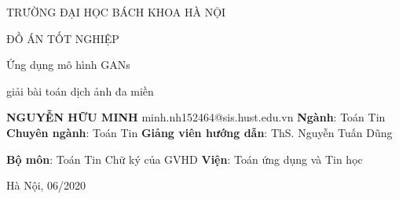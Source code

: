 {\begin{titlepage}
    \large {\bf \centerline {TRƯỜNG ĐẠI HỌC BÁCH KHOA HÀ NỘI}}
    \vskip 0.6in
    \vskip 0.7in
    \LARGE {\bf \centerline {ĐỒ ÁN TỐT NGHIỆP}}
    \vskip 0.6in
    \LARGE {\bf \centerline {Ứng dụng mô hình GANs}}
    \LARGE {\bf \centerline {giải bài toán dịch ảnh đa miền}}
    \vskip 0.6in
    \hspace{3cm}
    \normalsize {\bf NGUYỄN HỮU MINH}
    \vskip 0in
    \hspace{3cm}
    \normalsize {minh.nh152464@sis.hust.edu.vn}
    \vskip 0in
    \hspace{3cm}
    \normalsize {\textbf{Ngành}: Toán Tin}
    \vskip 0in
    \hspace{3cm}
    \normalsize {\textbf{Chuyên ngành}: Toán Tin}
    \vskip 1.5in
    \hspace{0.5cm}
    \small {\textbf{Giảng viên hướng dẫn}: ThS. Nguyễn Tuấn Dũng}
    \hspace{.5cm}
    \vskip 0in
    \hspace{0.5cm}
    \small {\textbf{Bộ môn}: Toán Tin \hspace{5.7cm} Chữ ký của GVHD}
    \vskip 0in
    \hspace{0.5cm}
    \small {\textbf{Viện}: Toán ứng dụng và Tin học}
    \vskip 2in
    \small {\centerline {Hà Nội, 06/2020}}
   \end{titlepage}
}

\def\titlepage{
  \newpage
  \linespread{1}
}
